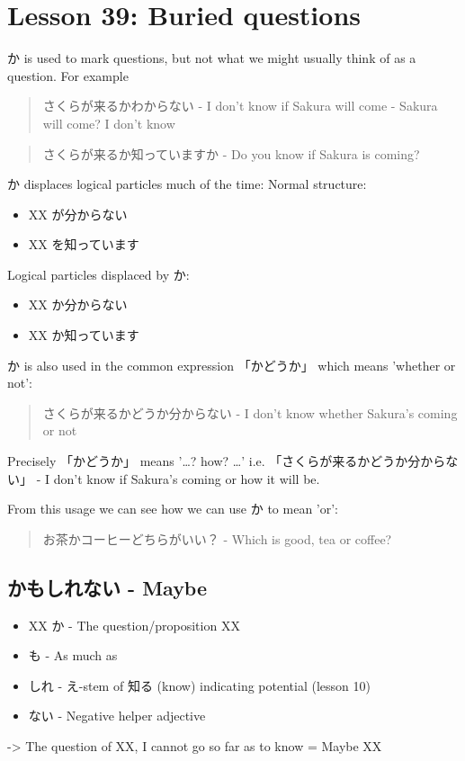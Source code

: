 \documentclass[11pt]{article}
\begin{document}
\section{Lesson 39: Buried questions}
\label{sec:orge0619e8}
か is used to mark questions, but not what we might usually think of as a question. For example
\begin{quote}
さくらが来るかわからない - I don't know if Sakura will come - Sakura will come? I don't know
\end{quote}
\begin{quote}
さくらが来るか知っていますか - Do you know if Sakura is coming?
\end{quote}

か displaces logical particles much of the time:
Normal structure:
\begin{itemize}
\item XX が分からない
\item XX を知っています
\end{itemize}
Logical particles displaced by か:
\begin{itemize}
\item XX か分からない
\item XX か知っています
\end{itemize}

か is also used in the common expression 「かどうか」 which means 'whether or not':
\begin{quote}
さくらが来るかどうか分からない - I don't know whether Sakura's coming or not
\end{quote}
Precisely 「かどうか」 means '\ldots{}? how? \ldots{}' i.e. 「さくらが来るかどうか分からない」 - I don't know if Sakura's coming or how it will be.

From this usage we can see how we can use か to mean 'or':
\begin{quote}
お茶かコーヒーどちらがいい？ - Which is good, tea or coffee?
\end{quote}

\subsection{かもしれない - Maybe}
\label{sec:org3f0395a}
\begin{itemize}
\item XX か - The question/proposition XX
\item も - As much as
\item しれ - え-stem of 知る (know) indicating potential (lesson 10)
\item ない - Negative helper adjective
\end{itemize}
-> The question of XX, I cannot go so far as to know = Maybe XX
\end{document}
